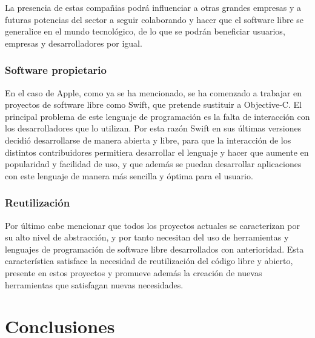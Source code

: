 \documentclass[a4paper, spanish, 12pt]{book}
\begin{document}
La presencia de estas compa\~nias podr\'a influenciar a otras grandes empresas y a futuras potencias del sector
a seguir colaborando y hacer que el software libre se generalice en el mundo tecnol\'ogico, de lo que se podr\'an
beneficiar usuarios, empresas y desarrolladores por igual.

\subsection*{Software propietario}
\label{subsec:propietary_sw}

En el caso de Apple, como ya se ha mencionado, se ha comenzado a trabajar en proyectos de software libre
como Swift, que pretende sustituir a Objective-C. El principal problema
de este lenguaje de programaci\'on es la falta de interacci\'on con los desarrolladores que lo utilizan.
Por esta raz\'on Swift en sus \'ultimas versiones decidi\'o desarrollarse de manera abierta y libre, para que la interacci\'on
de los distintos contribuidores permitiera desarrollar el lenguaje y hacer que aumente en popularidad y facilidad de uso,
y que adem\'as se puedan desarrollar aplicaciones con este lenguaje de manera m\'as sencilla y \'optima para el usuario.

\subsection*{Reutilizaci\'on}
\label{subsec:reutilizacion}

Por \'ultimo cabe mencionar que todos los proyectos actuales se caracterizan por su alto nivel de abstracci\'on, y por
tanto necesitan del uso de herramientas y lenguajes de programaci\'on de software libre desarrollados con anterioridad.
Esta caracter\'istica satisface la necesidad de reutilizaci\'on del c\'odigo libre y abierto, presente en estos proyectos
y promueve adem\'as la creaci\'on de nuevas herramientas que satisfagan nuevas necesidades.



\cleardoublepage
\chapter{Conclusiones}
\label{chap:conclusiones}
\end{document}
